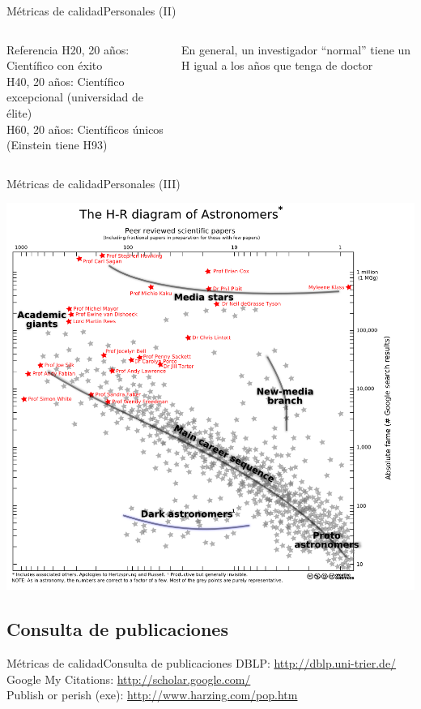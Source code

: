 \documentclass{beamer}
\begin{document}
\begin{frame}{Métricas de calidad}{Personales (II)}
	\begin{center}
	\begin{columns}
	\column{\textwidth}
	\begin{block}{Referencia}
		H20, 20 años: Científico con éxito\\
		H40, 20 años: Científico excepcional (universidad de élite)\\
		H60, 20 años: Científicos únicos (Einstein tiene H93)
	\end{block}
	\alert{En general, un investigador ``normal'' tiene un H igual a los años que tenga de doctor}
	\end{columns}
	\end{center}
\end{frame}

\begin{frame}[plain]{Métricas de calidad}{Personales (III)}
	\begin{center}
      	\includegraphics[width=0.8\linewidth]{figs/astronomos.png}
	\end{center}
\end{frame}

\subsection{Consulta de publicaciones}

\begin{frame}{Métricas de calidad}{Consulta de publicaciones}
	DBLP: \url{http://dblp.uni-trier.de/}\\
	Google My Citations: \url{http://scholar.google.com/}\\
	Publish or perish (exe): \url{http://www.harzing.com/pop.htm}
\end{frame}
\end{document}
